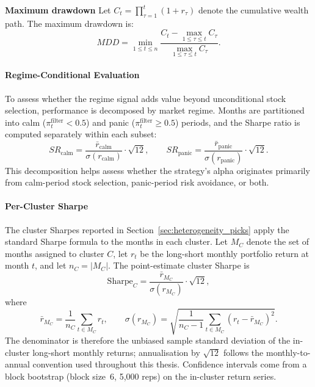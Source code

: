 \textbf{Maximum drawdown} Let $C_t = \prod_{\tau=1}^{t}(1 + r_\tau)$ denote the cumulative wealth path. The maximum drawdown is:
\begin{equation}
    MDD = \min_{1 \leq t \leq n} \frac{C_t - \max_{1 \leq \tau \leq t} C_\tau}{\max_{1 \leq \tau \leq t} C_\tau}.
\end{equation}

\paragraph{Regime-Conditional Evaluation}

To assess whether the regime signal adds value beyond unconditional stock selection, performance is decomposed by market regime. Months are partitioned into calm ($\pi_t^{\text{filter}} < 0.5$) and panic ($\pi_t^{\text{filter}} \geq 0.5$) periods, and the Sharpe ratio is computed separately within each subset:
\begin{equation}
    SR_{\text{calm}} = \frac{\bar{r}_{\text{calm}}}{\sigma(r_{\text{calm}})} \cdot \sqrt{12}, \qquad SR_{\text{panic}} = \frac{\bar{r}_{\text{panic}}}{\sigma(r_{\text{panic}})} \cdot \sqrt{12}.
\end{equation}
This decomposition helps assess whether the strategy's alpha originates primarily from calm-period stock selection, panic-period risk avoidance, or both.

\paragraph{Per-Cluster Sharpe}

The cluster Sharpes reported in Section~\ref{sec:heterogeneity_picks} apply the standard Sharpe formula to the months in each cluster. Let $M_C$ denote the set of months assigned to cluster $C$, let $r_t$ be the long-short monthly portfolio return at month $t$, and let $n_C = |M_C|$. The point-estimate cluster Sharpe is
\[
\mathrm{Sharpe}_C = \frac{\bar{r}_{M_C}}{\sigma(r_{M_C})} \cdot \sqrt{12},
\]
where
\[
\bar{r}_{M_C} = \frac{1}{n_C} \sum_{t \in M_C} r_t, \qquad \sigma(r_{M_C}) = \sqrt{\frac{1}{n_C - 1} \sum_{t \in M_C} (r_t - \bar{r}_{M_C})^2}.
\]
The denominator is therefore the unbiased sample standard deviation of the in-cluster long-short monthly returns; annualisation by $\sqrt{12}$ follows the monthly-to-annual convention used throughout this thesis. Confidence intervals come from a block bootstrap (block size~6, 5{,}000 reps) on the in-cluster return series.

